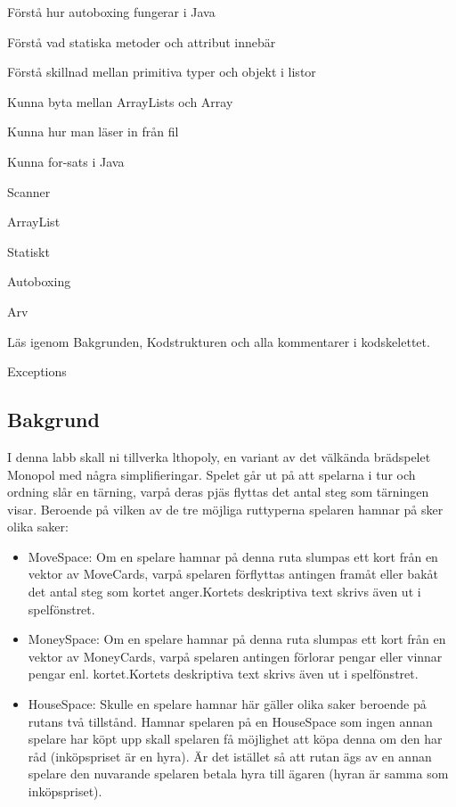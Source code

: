 

\Lab{\LabWeekELEVEN}

\begin{Goals}
\item Förstå hur autoboxing fungerar i Java
\item Förstå vad statiska metoder och attribut innebär
\item Förstå skillnad mellan primitiva typer och objekt i listor
\item Kunna byta mellan ArrayLists och Array
\item Kunna hur man läser in från fil
\item Kunna for-sats i Java
\end{Goals}

\begin{Preparations}
\item Scanner
\item ArrayList
\item Statiskt
\item Autoboxing
\item Arv
\item Läs igenom Bakgrunden, Kodstrukturen och alla kommentarer i kodskelettet.
\item Exceptions
\end{Preparations}

\subsection{Bakgrund}
I denna labb skall ni tillverka lthopoly, en variant av det välkända brädspelet Monopol med några simplifieringar. Spelet går ut på att spelarna i tur och ordning slår en tärning, varpå deras pjäs flyttas det antal steg som tärningen visar. 
Beroende på vilken av de tre möjliga ruttyperna spelaren hamnar på sker olika saker:

\begin{itemize}
\item MoveSpace: Om en spelare hamnar på denna ruta slumpas ett kort från en vektor av MoveCards, varpå spelaren förflyttas antingen framåt eller bakåt det antal steg som kortet anger.Kortets deskriptiva text skrivs även ut i spelfönstret.
\item MoneySpace: Om en spelare hamnar på denna ruta slumpas ett kort från en vektor av MoneyCards, varpå spelaren antingen förlorar pengar eller vinnar pengar enl. kortet.Kortets deskriptiva text skrivs även ut i spelfönstret.
\item HouseSpace: Skulle en spelare hamnar här gäller olika saker beroende på rutans två tillstånd. Hamnar spelaren på en HouseSpace som ingen annan spelare har köpt upp skall spelaren få möjlighet att köpa denna om den har råd (inköpspriset är en hyra). Är det istället så att rutan ägs av en annan spelare den nuvarande spelaren betala hyra till ägaren (hyran är samma som inköpspriset). 
\end{itemize}

